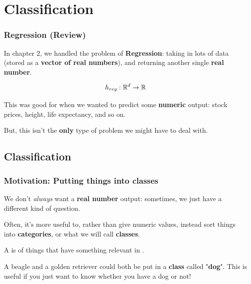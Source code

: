 \setcounter{chapter}{3}

\chapter{Classification}

    \subsection{Regression (Review)}
    
        In chapter 2, we handled the problem of \textbf{Regression}: taking in lots of data (stored as a \textbf{vector of real numbers}), and returning another single \textbf{real number}.
        
        \begin{equation}
            h_{reg}: \mathbb R^d \rightarrow \mathbb R
        \end{equation}
        
        This was good for when we wanted to predict some \textbf{numeric} output: stock prices, height, life expectancy, and so on.
        
        But, this isn't the \textbf{only} type of problem we might have to deal with.

\section{Classification}

    \subsection{Motivation: Putting things into classes}
        
        We don't \textit{always} want a \textbf{real number} output: sometimes, we just have a different kind of question.
        
        Often, it's more useful to, rather than give numeric values, instead sort things into \textbf{categories}, or what we will call \textbf{classes}.\\
        
        \begin{definition}
            A  is  of things that have something relevant in .
        \end{definition}
        
        \miniex A beagle and a golden retriever could both be put in a \textbf{class} called "\textbf{dog}". This is useful if you just want to know whether you have a dog or not!
        
